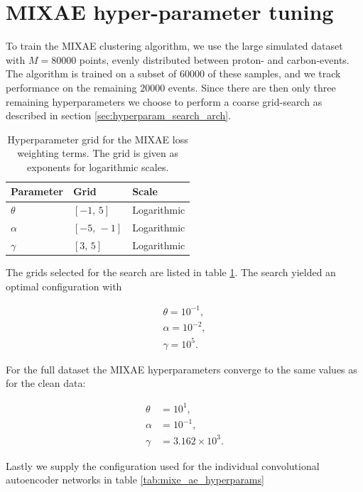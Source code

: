 \documentclass[review,number,sort&compress]{elsarticle}
\begin{document}
\section{MIXAE hyper-parameter tuning}

To train the MIXAE clustering algorithm, we use the large simulated dataset with $M=80000$ points, evenly distributed between proton- and carbon-events. The algorithm is trained on a subset of $60000$ of these samples, and we track performance on the remaining $20000$ events. Since there are then only three remaining hyperparameters we choose to perform a coarse grid-search as described in section \ref{sec:hyperparam_search_arch}.

\begin{table}
\centering
\caption{Hyperparameter grid for the MIXAE loss weighting terms. The grid is given as exponents for logarithmic scales.}\label{tab:mixae_loss_weights}
\begin{tabular}{lll}
\toprule
Parameter & Grid & Scale \\
\midrule 
$\theta$ & $[-1,\, 5]$ & Logarithmic \\
$\alpha$ & $[-5,\, -1]$ & Logarithmic \\
$\gamma$ & $[3,\, 5]$ & Logarithmic
\end{tabular}
\end{table}

The grids selected for the search are listed in table \ref{tab:mixae_loss_weights}. The search yielded an optimal configuration with 

\begin{align}
\theta = 10^{-1}, \\
\alpha = 10^{-2}, \\
\gamma = 10^5.
\end{align}

For the full dataset the MIXAE hyperparameters converge to the same values as for the clean data:

\begin{align}
\theta &= 10^{1}, \\
\alpha &= 10^{-1}, \\
\gamma &= 3.162\times 10^3.
\end{align}

Lastly we supply the configuration used for the individual convolutional autoencoder networks in table \ref{tab:mixe_ae_hyperparams}
\end{document}
